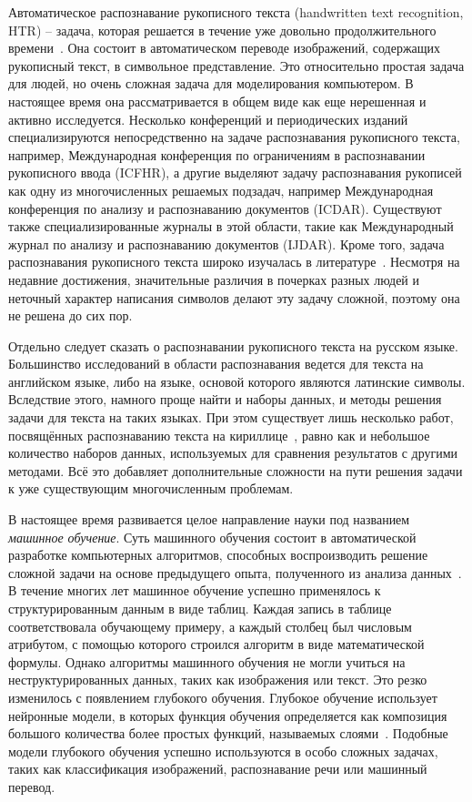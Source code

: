 Автоматическое распознавание рукописного текста (handwritten text recognition, HTR) -- задача, которая решается в течение уже довольно продолжительного времени~\cite{plamondon2000online}.
Она состоит в автоматическом переводе изображений, содержащих рукописный текст, в символьное представление.
Это относительно простая задача для людей, но очень сложная задача для моделирования компьютером.
В настоящее время она рассматривается в общем виде как еще нерешенная и активно исследуется.
Несколько конференций и периодических изданий специализируются непосредственно на задаче распознавания рукописного текста, например,
Международная конференция по ограничениям в распознавании рукописного ввода (ICFHR),
а другие выделяют задачу распознавания рукописей как одну из многочисленных решаемых подзадач,
например Международная конференция по анализу и распознаванию документов (ICDAR).
Существуют также специализированные журналы в этой области, такие как Международный журнал по анализу и распознаванию документов (IJDAR).
Кроме того, задача распознавания рукописного текста широко изучалась в литературе~\cite{plamondon2000online,sueiras2021continuous}.
Несмотря на недавние достижения, значительные различия в почерках разных людей и неточный характер написания символов
делают эту задачу сложной, поэтому она не решена до сих пор.

Отдельно следует сказать о распознавании рукописного текста на русском языке.
Большинство исследований в области распознавания ведется для текста на английском языке, либо на языке, основой которого являются латинские символы.
Вследствие этого, намного проще найти и наборы данных, и методы решения задачи для текста на таких языках.
При этом существует лишь несколько работ, посвящённых распознаванию текста на кириллице~\cite{abdallah2020attention,shonenkov2021stackmix},
равно как и небольшое количество наборов данных, используемых для сравнения результатов с другими методами.
Всё это добавляет дополнительные сложности на пути решения задачи к уже существующим многочисленным проблемам.

В настоящее время развивается целое направление науки под названием \textit{машинное обучение}.
Суть машинного обучения состоит в автоматической разработке компьютерных алгоритмов,
способных воспроизводить решение сложной задачи на основе предыдущего опыта, полученного из анализа данных~\cite{prakash2021pattern}.
В течение многих лет машинное обучение успешно применялось к структурированным данным в виде таблиц.
Каждая запись в таблице соответствовала обучающему примеру, а каждый столбец был числовым атрибутом, с помощью которого строился алгоритм в виде математической формулы.
Однако алгоритмы машинного обучения не могли учиться на неструктурированных данных, таких как изображения или текст.
Это резко изменилось с появлением глубокого обучения.
Глубокое обучение использует нейронные модели, в которых функция обучения определяется как композиция
большого количества более простых функций, называемых слоями~\cite{goodfellow2016deep}.
Подобные модели глубокого обучения успешно используются в особо сложных задачах, таких как классификация изображений, распознавание речи или машинный перевод.

